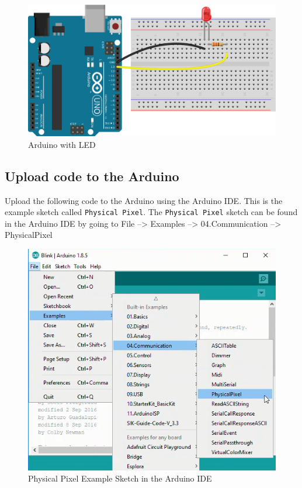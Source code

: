 \documentclass{book}
\makeatletter
\def\maxwidth{\ifdim\Gin@nat@width>\linewidth\linewidth
    \else\Gin@nat@width\fi}
\let\Oldincludegraphics\includegraphics
\renewcommand{\includegraphics}[1]{\Oldincludegraphics[width=.8\maxwidth]{#1}}
\makeatother
\begin{document}
    \begin{figure}
\centering
\includegraphics{images/arduino_LED.png}
\caption{Arduino with LED}
\end{figure}

    \subsection{Upload code to the
Arduino}\label{upload-code-to-the-arduino}

    Upload the following code to the Arduino using the Arduino IDE. This is
the example sketch called \lstinline!Physical Pixel!. The
\lstinline!Physical Pixel! sketch can be found in the Arduino IDE by
going to File --\textgreater{} Examples --\textgreater{}
04.Communication --\textgreater{} PhysicalPixel

\begin{figure}
\centering
\includegraphics{images/file-examples-communication-physicalpixel.png}
\caption{Physical Pixel Example Sketch in the Arduino IDE}
\end{figure}
\end{document}
